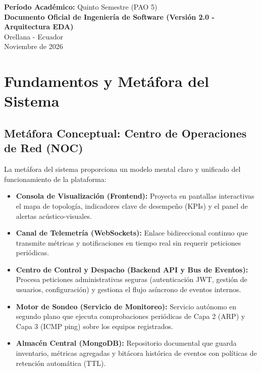 \documentclass[12pt,a4paper]{report}
\begin{document}
\begin{titlepage}
  \vfill

  {\small\textbf{Período Académico:} Quinto Semestre (PAO 5)}\\[0.05cm]
  {\small\textbf{Documento Oficial de Ingeniería de Software (Versión 2.0 - Arquitectura EDA)}}\\[0.6cm]

  {\small Orellana - Ecuador}\\[0.15cm]
  {\small Noviembre de 2026}
\end{titlepage}

\tableofcontents
\newpage

\listoffigures
\newpage

\listoftables
\newpage

\chapter{Fundamentos y Metáfora del Sistema}

\section{Metáfora Conceptual: Centro de Operaciones de Red (NOC)}
La metáfora del sistema proporciona un modelo mental claro y unificado del funcionamiento de la plataforma:
\begin{itemize}
  \item \textbf{Consola de Visualización (Frontend):} Proyecta en pantallas interactivas el mapa de topología, indicadores clave de desempeño (KPIs) y el panel de alertas acústico-visuales.
  \item \textbf{Canal de Telemetría (WebSockets):} Enlace bidireccional continuo que transmite métricas y notificaciones en tiempo real sin requerir peticiones periódicas.
  \item \textbf{Centro de Control y Despacho (Backend API y Bus de Eventos):} Procesa peticiones administrativas seguras (autenticación JWT, gestión de usuarios, configuración) y gestiona el flujo asíncrono de eventos internos.
  \item \textbf{Motor de Sondeo (Servicio de Monitoreo):} Servicio autónomo en segundo plano que ejecuta comprobaciones periódicas de Capa 2 (ARP) y Capa 3 (ICMP ping) sobre los equipos registrados.
  \item \textbf{Almacén Central (MongoDB):} Repositorio documental que guarda inventario, métricas agregadas y bitácora histórica de eventos con políticas de retención automática (TTL).
\end{itemize}
\end{document}
